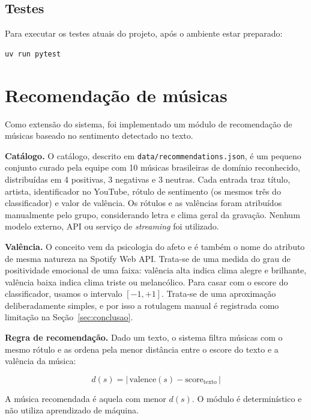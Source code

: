 \documentclass[11pt,a4paper]{article}
\begin{document}
\subsection*{Testes}

Para executar os testes atuais do projeto, após o ambiente estar preparado:

\begin{verbatim}
uv run pytest
\end{verbatim}

\section{Recomendação de músicas}

Como extensão do sistema, foi implementado um módulo de recomendação de músicas baseado no sentimento detectado no texto.

\textbf{Catálogo.} O catálogo, descrito em \texttt{data/recommendations.json}, é um pequeno conjunto curado pela equipe com 10 músicas brasileiras de domínio reconhecido, distribuídas em 4 positivas, 3 negativas e 3 neutras. Cada entrada traz título, artista, identificador no YouTube, rótulo de sentimento (os mesmos três do classificador) e valor de valência. Os rótulos e as valências foram atribuídos manualmente pelo grupo, considerando letra e clima geral da gravação. Nenhum modelo externo, API ou serviço de \emph{streaming} foi utilizado.

\textbf{Valência.} O conceito vem da psicologia do afeto \citep{russell1980circumplex} e é também o nome do atributo de mesma natureza na Spotify Web API. Trata-se de uma medida do grau de positividade emocional de uma faixa: valência alta indica clima alegre e brilhante, valência baixa indica clima triste ou melancólico. Para casar com o escore do classificador, usamos o intervalo $[-1, +1]$. Trata-se de uma aproximação deliberadamente simples, e por isso a rotulagem manual é registrada como limitação na Seção~\ref{sec:conclusao}.

\textbf{Regra de recomendação.} Dado um texto, o sistema filtra músicas com o mesmo rótulo e as ordena pela menor distância entre o escore do texto e a valência da música:

\begin{equation}
d(s) = |\,\text{valence}(s) - \text{score}_{\text{texto}}\,|
\end{equation}

A música recomendada é aquela com menor $d(s)$. O módulo é determinístico e não utiliza aprendizado de máquina.
\end{document}
